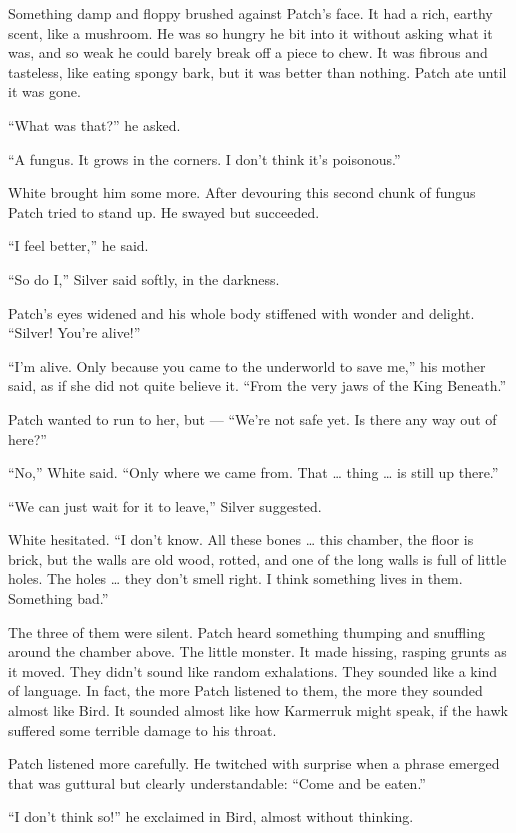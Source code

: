 \documentclass[12pt]{memoir}
\begin{document}
Something damp and floppy brushed against Patch’s face. It had a rich,
earthy scent, like a mushroom. He was so hungry he bit into it without
asking what it was, and so weak he could barely break off a piece to
chew. It was fibrous and tasteless, like eating spongy bark, but it
was better than nothing. Patch ate until it was gone.

“What was that?” he asked.

“A fungus. It grows in the corners. I don’t think it’s poisonous.”

White brought him some more. After devouring this second chunk of
fungus Patch tried to stand up. He swayed but succeeded.

“I feel better,” he said.

“So do I,” Silver said softly, in the darkness.

Patch’s eyes widened and his whole body stiffened with wonder and
delight. “Silver! You’re alive!”

“I’m alive. Only because you came to the underworld to save me,” his
mother said, as if she did not quite believe it. “From the very jaws
of the King Beneath.”

Patch wanted to run to her, but — “We’re not safe yet. Is there any
way out of here?”

“No,” White said. “Only where we came from. That … thing … is still up
there.”

“We can just wait for it to leave,” Silver suggested.

White hesitated. “I don’t know. All these bones … this chamber, the
floor is brick, but the walls are old wood, rotted, and one of the
long walls is full of little holes. The holes … they don’t smell
right. I think something lives in them. Something bad.”

The three of them were silent. Patch heard something thumping and
snuffling around the chamber above. The little monster. It made
hissing, rasping grunts as it moved. They didn’t sound like random
exhalations. They sounded like a kind of language. In fact, the more
Patch listened to them, the more they sounded almost like Bird. It
sounded almost like how Karmerruk might speak, if the hawk suffered
some terrible damage to his throat.

Patch listened more carefully. He twitched with surprise when a phrase
emerged that was guttural but clearly understandable: “Come and be
eaten.”

“I don’t think so!” he exclaimed in Bird, almost without thinking.
\end{document}
